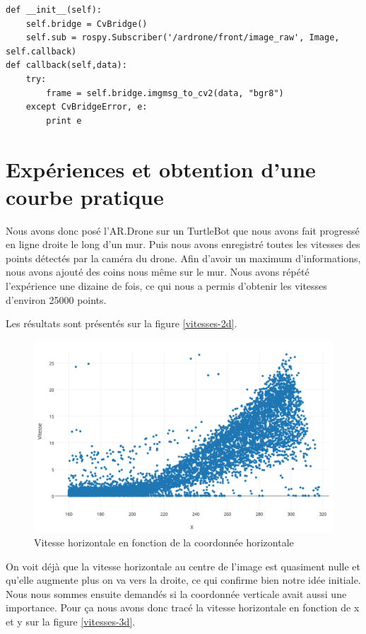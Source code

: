 \documentclass[titlepage,11pt,a4paper]{article}
\begin{document}
\begin{lstlisting}
def __init__(self):
	self.bridge = CvBridge()
	self.sub = rospy.Subscriber('/ardrone/front/image_raw', Image, self.callback)
def callback(self,data):
	try:
		frame = self.bridge.imgmsg_to_cv2(data, "bgr8")
	except CvBridgeError, e:
		print e
\end{lstlisting}

\section{Expériences et obtention d'une courbe \og{}pratique\fg{}}
Nous avons donc posé l'AR.Drone sur un TurtleBot que nous avons fait progressé en ligne droite le long d'un mur. Puis nous avons enregistré toutes les vitesses des points détectés par la caméra du drone. Afin d'avoir un maximum d'informations, nous avons ajouté des coins nous même sur le mur. Nous avons répété l'expérience une dizaine de fois, ce qui nous a permis d'obtenir les vitesses d'environ \num{25000} points.

Les résultats sont présentés sur la figure \vref{vitesses-2d}.

\begin{figure}
	\centering
	\caption{\label{vitesses-2d} Vitesse horizontale en fonction de la coordonnée horizontale}
	\includegraphics[scale=0.45]{images/vitesses-2d.png}
\end{figure}

On voit déjà que la vitesse horizontale au centre de l'image est quasiment nulle et qu'elle augmente plus on va vers la droite, ce qui confirme bien notre idée initiale. Nous nous sommes ensuite demandés si la coordonnée verticale avait aussi une importance. Pour ça nous avons donc tracé la vitesse horizontale en fonction de x et y sur la figure \vref{vitesses-3d}.
\end{document}
